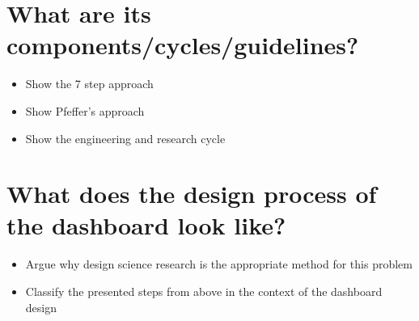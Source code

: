 \section{What are its components/cycles/guidelines?}
\begin{itemize}
    \item Show the 7 step approach
    \item Show Pfeffer's approach
    \item Show the engineering and research cycle
\end{itemize}

\section{What does the design process of the dashboard look like?}
\begin{itemize}
    \item Argue why design science research is the appropriate method for this problem
    \item Classify the presented steps from above in the context of the dashboard design
\end{itemize}